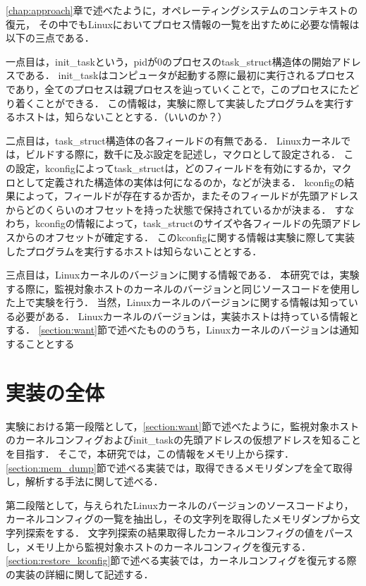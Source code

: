 \ref{chap:approach}章で述べたように，オペレーティングシステムのコンテキストの復元，
その中でもLinuxにおいてプロセス情報の一覧を出すために必要な情報は以下の三点である．

一点目は，init\_taskという，pidが0のプロセスのtask\_struct構造体の開始アドレスである．
init\_taskはコンピュータが起動する際に最初に実行されるプロセスであり，全てのプロセスは親プロセスを辿っていくことで，このプロセスにたどり着くことができる．
この情報は，実験に際して実装したプログラムを実行するホストは，知らないこととする．（いいのか？）

二点目は，task\_struct構造体の各フィールドの有無である．
Linuxカーネルでは，ビルドする際に，数千に及ぶ設定を記述し，マクロとして設定される．
この設定，kconfigによってtask\_structは，どのフィールドを有効にするか，マクロとして定義された構造体の実体は何になるのか，などが決まる．
kconfigの結果によって，フィールドが存在するか否か，またそのフィールドが先頭アドレスからどのくらいのオフセットを持った状態で保持されているかが決まる．
すなわち，kconfigの情報によって，task\_structのサイズや各フィールドの先頭アドレスからのオフセットが確定する．
このkconfigに関する情報は実験に際して実装したプログラムを実行するホストは知らないこととする．

三点目は，Linuxカーネルのバージョンに関する情報である．
本研究では，実験する際に，監視対象ホストのカーネルのバージョンと同じソースコードを使用した上で実験を行う．
当然，Linuxカーネルのバージョンに関する情報は知っている必要がある．
Linuxカーネルのバージョンは，実装ホストは持っている情報とする．
\ref{section:want}節で述べたもののうち，Linuxカーネルのバージョンは通知することとする

\section{実装の全体}


実験における第一段階として，\ref{section:want}節で述べたように，監視対象ホストのカーネルコンフィグおよびinit\_taskの先頭アドレスの仮想アドレスを知ることを目指す．
そこで，本研究では，この情報をメモリ上から探す．\ref{section:mem_dump}節で述べる実装では，取得できるメモリダンプを全て取得し，解析する手法に関して述べる．

第二段階として，与えられたLinuxカーネルのバージョンのソースコードより，カーネルコンフィグの一覧を抽出し，その文字列を取得したメモリダンプから文字列探索をする．
文字列探索の結果取得したカーネルコンフィグの値をパースし，メモリ上から監視対象ホストのカーネルコンフィグを復元する．
\ref{section:restore_kconfig}節で述べる実装では，カーネルコンフィグを復元する際の実装の詳細に関して記述する．

